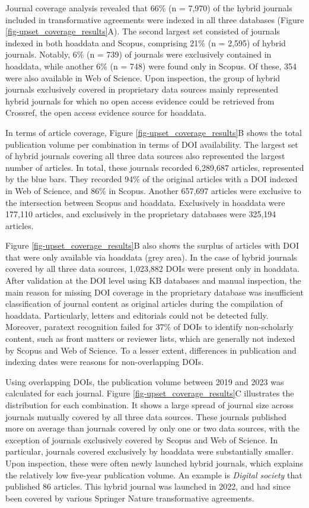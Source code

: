 \documentclass[a4paper,man,floatsintext,longtable,noextraspace,10pt]{apa6}
\begin{document}
Journal coverage analysis revealed that 66\% (n = 7,970) of the hybrid
journals included in transformative agreements were indexed in all three
databases (Figure \ref{fig-upset_coverage_results}A). The second largest
set consisted of journals indexed in both hoaddata and Scopus,
comprising 21\% (n = 2,595) of hybrid journals. Notably, 6\% (n = 739)
of journals were exclusively contained in hoaddata, while another 6\% (n
= 748) were found only in Scopus. Of these, 354 were also available in
Web of Science. Upon inspection, the group of hybrid journals
exclusively covered in proprietary data sources mainly represented
hybrid journals for which no open access evidence could be retrieved
from Crossref, the open access evidence source for hoaddata.

In terms of article coverage, Figure \ref{fig-upset_coverage_results}B
shows the total publication volume per combination in terms of DOI
availability. The largest set of hybrid journals covering all three data
sources also represented the largest number of articles. In total, these
journals recorded 6,289,687 articles, represented by the blue bars. They
recorded 94\% of the original articles with a DOI indexed in Web of
Science, and 86\% in Scopus. Another 657,697 articles were exclusive to
the intersection between Scopus and hoaddata. Exclusively in hoaddata
were 177,110 articles, and exclusively in the proprietary databases were
325,194 articles.

Figure \ref{fig-upset_coverage_results}B also shows the surplus of
articles with DOI that were only available via hoaddata (grey area). In
the case of hybrid journals covered by all three data sources, 1,023,882
DOIs were present only in hoaddata. After validation at the DOI level
using KB databases and manual inspection, the main reason for missing
DOI coverage in the proprietary database was insufficient classification
of journal content as original articles during the compilation of
hoaddata. Particularly, letters and editorials could not be detected
fully. Moreover, paratext recognition failed for 37\% of DOIs to
identify non-scholarly content, such as front matters or reviewer lists,
which are generally not indexed by Scopus and Web of Science. To a
lesser extent, differences in publication and indexing dates were
reasons for non-overlapping DOIs.

Using overlapping DOIs, the publication volume between 2019 and 2023 was
calculated for each journal. Figure \ref{fig-upset_coverage_results}C
illustrates the distribution for each combination. It shows a large
spread of journal size across journals mutually covered by all three
data sources. These journals published more on average than journals
covered by only one or two data sources, with the exception of journals
exclusively covered by Scopus and Web of Science. In particular,
journals covered exclusively by hoaddata were substantially smaller.
Upon inspection, these were often newly launched hybrid journals, which
explains the relatively low five-year publication volume. An example is
\emph{Digital society} that published 86 articles. This hybrid journal
was launched in 2022, and had since been covered by various Springer
Nature transformative agreements.
\end{document}
